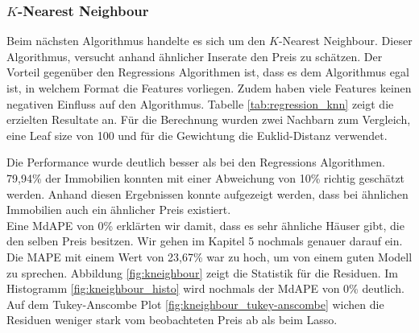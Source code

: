 \subsubsection{$K$-Nearest Neighbour}
\label{chapter:KNN}
Beim nächsten Algorithmus handelte es sich um den $K$-Nearest Neighbour. Dieser Algorithmus, versucht anhand ähnlicher Inserate den Preis zu schätzen. Der Vorteil gegenüber den Regressions Algorithmen ist, dass es dem Algorithmus egal ist, in welchem Format die Features vorliegen. Zudem haben viele Features keinen negativen Einfluss auf den Algorithmus.
Tabelle \ref{tab:regression_knn} zeigt die erzielten Resultate an. Für die Berechnung wurden zwei Nachbarn zum Vergleich, eine Leaf size von 100 und für die Gewichtung die Euklid-Distanz verwendet.

\begin{table}[ht]
\centering
{}
\caption{Ergebnisse von $K$-Nearest Neighbour}
\label{tab:regression_knn}
\end{table}

Die Performance wurde deutlich besser als bei den Regressions Algorithmen. 79,94\% der Immobilien konnten mit einer Abweichung von 10\% richtig geschätzt werden. Anhand diesen Ergebnissen konnte aufgezeigt werden, dass bei ähnlichen Immobilien auch ein ähnlicher Preis existiert.\\
Eine MdAPE von 0\% erklärten wir damit, dass es sehr ähnliche Häuser gibt, die den selben Preis besitzen. Wir gehen im Kapitel 5 nochmals genauer darauf ein. Die MAPE mit einem Wert von 23,67\% war zu hoch, um von einem guten Modell zu sprechen. Abbildung \ref{fig:kneighbour} zeigt die Statistik für die Residuen. Im Histogramm \ref{fig:kneighbour_histo} wird nochmals der MdAPE von 0\% deutlich. Auf dem Tukey-Anscombe Plot \ref{fig:kneighbour_tukey-anscombe} wichen die Residuen weniger stark vom beobachteten Preis ab als beim Lasso.

